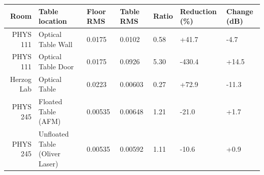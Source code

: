 \begin{tabular}{rllllll}
\toprule
Room & Table location & Floor RMS & Table RMS & Ratio & Reduction (\%) & Change (dB) \\
\midrule
PHYS 111 & Optical Table Wall & 0.0175 & 0.0102 & 0.58 & +41.7 & -4.7 \\
PHYS 111 & Optical Table Door & 0.0175 & 0.0926 & 5.30 & -430.4 & +14.5 \\
Herzog Lab & Optical Table & 0.0223 & 0.00603 & 0.27 & +72.9 & -11.3 \\
PHYS 245 & Floated Table (AFM) & 0.00535 & 0.00648 & 1.21 & -21.0 & +1.7 \\
PHYS 245 & Unfloated Table (Oliver Laser) & 0.00535 & 0.00592 & 1.11 & -10.6 & +0.9 \\
\bottomrule
\end{tabular}
